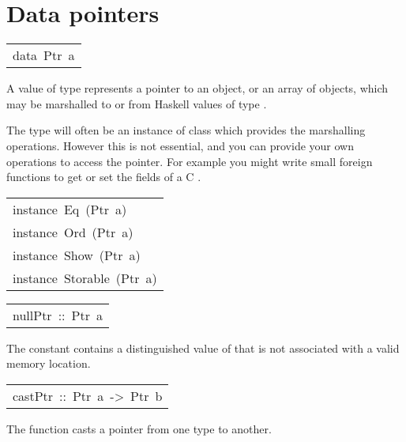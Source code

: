 \section{Data pointers
}
\begin{haddockdesc}
\item[\begin{tabular}{@{}l}
data\ Ptr\ a
\end{tabular}]\haddockbegindoc
A value of type  represents a pointer to an object, or an
 array of objects, which may be marshalled to or from Haskell values
 of type .
\par
The type  will often be an instance of class
  which provides the marshalling operations.
 However this is not essential, and you can provide your own operations
 to access the pointer.  For example you might write small foreign
 functions to get or set the fields of a C .
\par

\end{haddockdesc}
\begin{haddockdesc}
\item[\begin{tabular}{@{}l}
instance\ Eq\ (Ptr\ a)\\instance\ Ord\ (Ptr\ a)\\instance\ Show\ (Ptr\ a)\\instance\ Storable\ (Ptr\ a)
\end{tabular}]
\end{haddockdesc}
\begin{haddockdesc}
\item[\begin{tabular}{@{}l}
nullPtr\ ::\ Ptr\ a
\end{tabular}]\haddockbegindoc
The constant  contains a distinguished value of 
 that is not associated with a valid memory location.
\par

\end{haddockdesc}
\begin{haddockdesc}
\item[\begin{tabular}{@{}l}
castPtr\ ::\ Ptr\ a\ ->\ Ptr\ b
\end{tabular}]\haddockbegindoc
The  function casts a pointer from one type to another.
\par

\end{haddockdesc}
